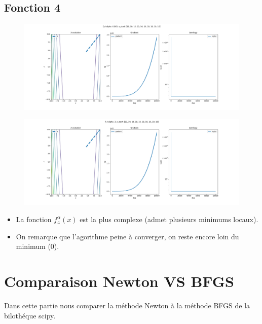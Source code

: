 \documentclass[twoside,10pt,a4paper]{article}
\numberwithin{equation}{section}					%
\numberwithin{figure}{section}						%
\begin{document}
\subsection{Fonction 4 }\label{sec:subsection2}
\begin{figure}[H]
    \centering
    \includegraphics[width=\textwidth]{imgs/newton/f_4_a-0.005_newton.png}
    \caption{}
\end{figure}
\begin{figure}[H]
    \centering
    \includegraphics[width=\textwidth]{imgs/newton/f_4_a-3_newton.png}
    \caption{}
\end{figure}
\begin{itemize}
	\item La fonction $f_4^{\alpha}(x)$ est la plus complexe (admet plusieurs minimums locaux).
	\item On remarque que l'agorithme peine à converger, on reste encore loin du minimum (0).
\end{itemize}



\section{Comparaison Newton VS BFGS}\label{sec:section2}
Dans cette partie nous comparer la méthode Newton à la méthode BFGS de la bilothéque scipy.
\end{document}
